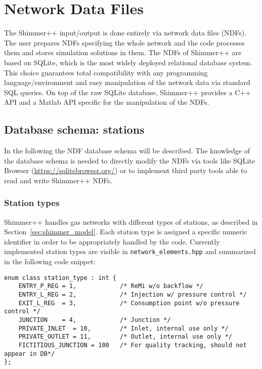 \section{Network Data Files}
The Shimmer++ input/output is done entirely via network data files (NDFs). The
user prepares NDFs specifying the whole network and the code processes them and
stores simulation solutions in them.
The NDFs of Shimmer++ are based on SQLite, which is the
most widely deployed relational database system. This choice guarantees total
compatibility with any programming language/environment and easy manipulation of
the network data via standard SQL queries. On top of the raw SQLite database, Shimmer++ provides a C++
API and a Matlab API specific for the manipulation of the NDFs.

\subsection{Database schema: stations}
In the following the NDF database schema will be described. The knowledge of
the database schema is needed to directly modify the NDFs via tools like
SQLite Browser (\url{https://sqlitebrowser.org/}) or to implement third party
tools able to read and write Shimmer++ NDFs.

\subsubsection{Station types}
Shimmer++ handles gas networks with different types of stations, as described
in Section~\ref{sec:shimmer_model}. Each station type is assigned a specific
numeric identifier in order to be appropriately handled by the code. Currently
implemented station types are visible in \texttt{network\_elements.hpp} and
summarized in the following code snippet: 

\begin{verbatim}
enum class station_type : int {
    ENTRY_P_REG = 1,            /* ReMi w/o backflow */
    ENTRY_L_REG = 2,            /* Injection w/ pressure control */
    EXIT_L_REG  = 3,            /* Consumption point w/o pressure control */
    JUNCTION    = 4,            /* Junction */
    PRIVATE_INLET  = 10,        /* Inlet, internal use only */
    PRIVATE_OUTLET = 11,        /* Outlet, internal use only */
    FICTITIOUS_JUNCTION = 100   /* For quality tracking, should not appear in DB*/
};
\end{verbatim}

